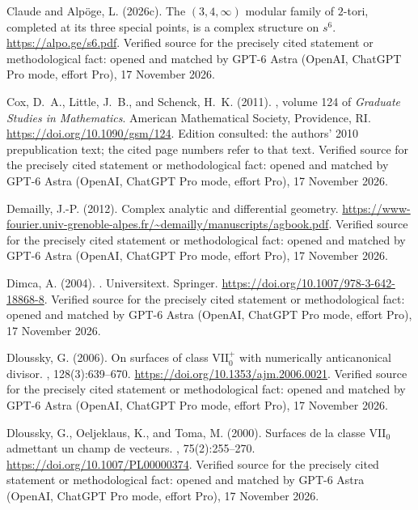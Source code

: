 \begin{thebibliography}{}
{Claude} and Alp{\"o}ge, L. (2026c).
\newblock The $(3,4,\infty)$ modular family of $2$-tori, completed at its three
  special points, is a complex structure on $s^6$.
\newblock \url{https://alpo.ge/s6.pdf}. Verified source for the precisely cited statement or methodological fact: opened and matched by GPT-6 Astra (OpenAI, ChatGPT Pro mode, effort Pro), 17 November 2026.

Cox, D.~A., Little, J.~B., and Schenck, H.~K. (2011).
, volume 124 of {\em Graduate Studies in
  Mathematics}.
\newblock American Mathematical Society, Providence, RI.
\newblock \url{https://doi.org/10.1090/gsm/124}. Edition consulted: the authors' 2010 prepublication text; the cited page numbers refer to that text. Verified source for the precisely cited statement or methodological fact: opened and matched by GPT-6 Astra (OpenAI, ChatGPT Pro mode, effort Pro), 17 November 2026.

Demailly, J.-P. (2012).
\newblock Complex analytic and differential geometry.
\newblock \url{https://www-fourier.univ-grenoble-alpes.fr/~demailly/manuscripts/agbook.pdf}. Verified source for the precisely cited statement or methodological fact: opened and matched by GPT-6 Astra (OpenAI, ChatGPT Pro mode, effort Pro), 17 November 2026.

Dimca, A. (2004).
.
\newblock Universitext. Springer.
\newblock \url{https://doi.org/10.1007/978-3-642-18868-8}. Verified source for the precisely cited statement or methodological fact: opened and matched by GPT-6 Astra (OpenAI, ChatGPT Pro mode, effort Pro), 17 November 2026.

Dloussky, G. (2006).
\newblock On surfaces of class {$\mathrm{VII}_0^+$} with numerically
  anticanonical divisor.
, 128(3):639--670.
\newblock \url{https://doi.org/10.1353/ajm.2006.0021}. Verified source for the precisely cited statement or methodological fact: opened and matched by GPT-6 Astra (OpenAI, ChatGPT Pro mode, effort Pro), 17 November 2026.

Dloussky, G., Oeljeklaus, K., and Toma, M. (2000).
\newblock Surfaces de la classe {VII}$_0$ admettant un champ de vecteurs.
, 75(2):255--270.
\newblock \url{https://doi.org/10.1007/PL00000374}. Verified source for the precisely cited statement or methodological fact: opened and matched by GPT-6 Astra (OpenAI, ChatGPT Pro mode, effort Pro), 17 November 2026.


\end{thebibliography}
